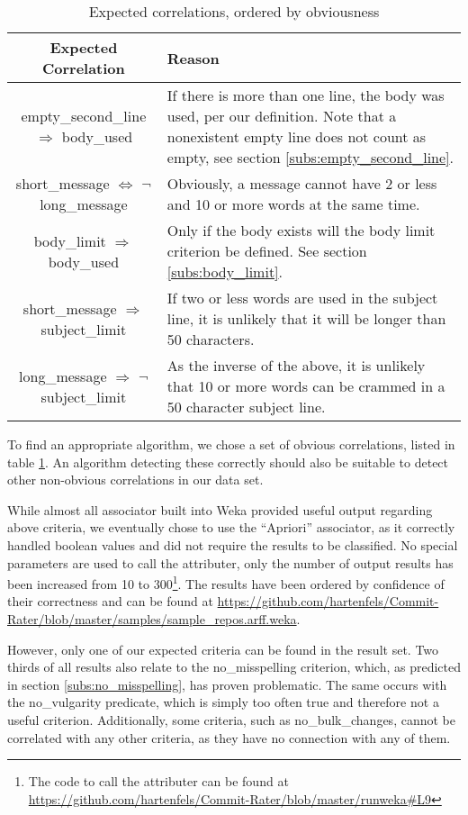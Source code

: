 \begin{table}[t]
    \begin{tabularx}{\textwidth}{|c|X|}\hline
        \textbf{Expected Correlation} & \textbf{Reason} \\\hline
        empty\_second\_line $\Rightarrow$ body\_used & If there is more than one line, the body was used, per our definition. Note that a nonexistent empty line does not count as empty, see section \ref{subs:empty_second_line}.\\\hline
        short\_message $\Leftrightarrow$ $\neg$ long\_message & Obviously, a message cannot have 2 or less and 10 or more words at the same time. \\\hline
        body\_limit $\Rightarrow$ body\_used & Only if the body exists will the body limit criterion be defined. See section \ref{subs:body_limit}. \\\hline
        short\_message $\Rightarrow$ subject\_limit & If two or less words are used in the subject line, it is unlikely that it will be longer than 50 characters. \\\hline
        long\_message $\Rightarrow$ $\neg$ subject\_limit & As the inverse of the above, it is unlikely that 10 or more words can be crammed in a 50 character subject line. \\\hline
    \end{tabularx}
    \caption{Expected correlations, ordered by obviousness}
    \label{tab:expect}
\end{table}

To find an appropriate algorithm, we chose a set of obvious correlations, listed in table \ref{tab:expect}. An algorithm detecting these correctly should also be suitable to detect other non-obvious correlations in our data set.

While almost all associator built into Weka provided useful output regarding above criteria, we eventually chose to use the ``Apriori'' associator\cite{FastWeka,ClassWeka}, as it correctly handled boolean values and did not require the results to be classified. No special parameters are used to call the attributer, only the number of output results has been increased from 10 to 300\footnote{The code to call the attributer can be found at \url{https://github.com/hartenfels/Commit-Rater/blob/master/runweka\#L9}}. The results have been ordered by confidence of their correctness and can be found at \url{https://github.com/hartenfels/Commit-Rater/blob/master/samples/sample\_repos.arff.weka}.

However, only one of our expected criteria can be found in the result set. Two thirds of all results also relate to the no\_misspelling criterion, which, as predicted in section \ref{subs:no_misspelling}, has proven problematic. The same occurs with the no\_vulgarity predicate, which is simply too often true and therefore not a useful criterion. Additionally, some criteria, such as no\_bulk\_changes, cannot be correlated with any other criteria, as they have no connection with any of them.

